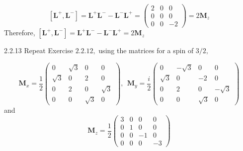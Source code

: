 $$
\left[\mathbf{L}^{+}, \mathbf{L}^{-}\right]=\mathbf{L}^{+} \mathbf{L}^{-}-\mathbf{L}^{-} \mathbf{L}^{+}=\left(\begin{array}{ccc}
2 & 0 & 0 \\
0 & 0 & 0 \\
0 & 0 & -2
\end{array}\right)=2 \mathbf{M}_{z}
$$
Therefore, $\left[\mathbf{L}^{+}, \mathbf{L}^{-}\right]=\mathbf{L}^{+} \mathbf{L}^{-}-\mathbf{L}^{-} \mathbf{L}^{+}=2 \mathbf{M}_{z}$








\newpage



\begin{mybox}{2.2.13}
Repeat Exercise $2.2 .12,$ using the matrices for a spin of $3 / 2,$

$$
\mathbf{M}_{x}=\frac{1}{2}\left(\begin{array}{cccc}
0 & \sqrt{3} & 0 & 0 \\
\sqrt{3} & 0 & 2 & 0 \\
0 & 2 & 0 & \sqrt{3} \\
0 & 0 & \sqrt{3} & 0
\end{array}\right), \ \ \mathbf{M}_{y}=\frac{i}{2}\left(\begin{array}{cccc}
0 & -\sqrt{3} & 0 & 0 \\
\sqrt{3} & 0 & -2 & 0 \\
0 & 2 & 0 & -\sqrt{3} \\
0 & 0 & \sqrt{3} & 0
\end{array}\right)
$$
and
$$
\mathbf{M}_{z}=\frac{1}{2}\left(\begin{array}{rrrr}
3 & 0 & 0 & 0 \\
0 & 1 & 0 & 0 \\
0 & 0 & -1 & 0 \\
0 & 0 & 0 & -3
\end{array}\right)
$$
\end{mybox}


